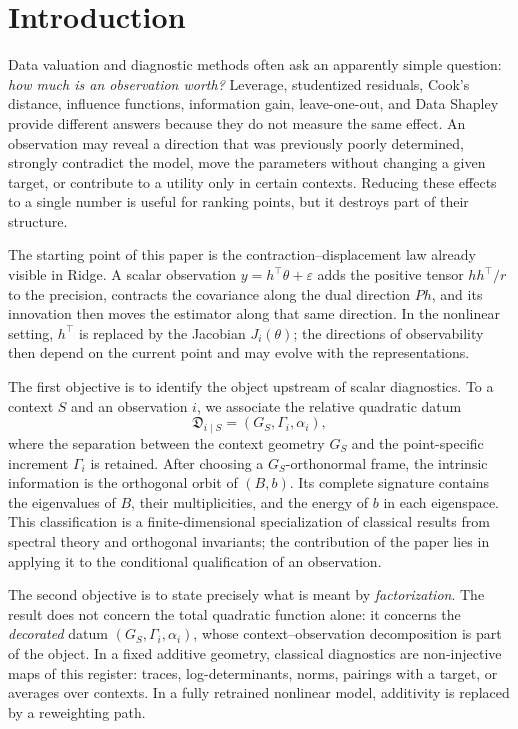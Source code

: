 \documentclass[10pt,a4paper]{article}
\newcommand{\Jreg}{\mathfrak D}
\begin{document}
\section{Introduction}
Data valuation and diagnostic methods often ask an apparently simple question: \emph{how much is an observation worth?} Leverage, studentized residuals, Cook's distance, influence functions, information gain, leave-one-out, and Data Shapley provide different answers because they do not measure the same effect. An observation may reveal a direction that was previously poorly determined, strongly contradict the model, move the parameters without changing a given target, or contribute to a utility only in certain contexts. Reducing these effects to a single number is useful for ranking points, but it destroys part of their structure.

The starting point of this paper is the contraction--displacement law already visible in Ridge. A scalar observation $y=h^\top\theta+\varepsilon$ adds the positive tensor $hh^\top/r$ to the precision, contracts the covariance along the dual direction $Ph$, and its innovation then moves the estimator along that same direction. In the nonlinear setting, $h^\top$ is replaced by the Jacobian $J_i(\theta)$; the directions of observability then depend on the current point and may evolve with the representations.

The first objective is to identify the object upstream of scalar diagnostics. To a context $S$ and an observation $i$, we associate the relative quadratic datum
\[
\Jreg_{i\mid S}=(G_S,\Gamma_i,\alpha_i),
\]
where the separation between the context geometry $G_S$ and the point-specific increment $\Gamma_i$ is retained. After choosing a $G_S$-orthonormal frame, the intrinsic information is the orthogonal orbit of $(B,b)$. Its complete signature contains the eigenvalues of $B$, their multiplicities, and the energy of $b$ in each eigenspace. This classification is a finite-dimensional specialization of classical results from spectral theory and orthogonal invariants; the contribution of the paper lies in applying it to the conditional qualification of an observation.

The second objective is to state precisely what is meant by \emph{factorization}. The result does not concern the total quadratic function alone: it concerns the \emph{decorated} datum $(G_S,\Gamma_i,\alpha_i)$, whose context--observation decomposition is part of the object. In a fixed additive geometry, classical diagnostics are non-injective maps of this register: traces, log-determinants, norms, pairings with a target, or averages over contexts. In a fully retrained nonlinear model, additivity is replaced by a reweighting path.
\end{document}
